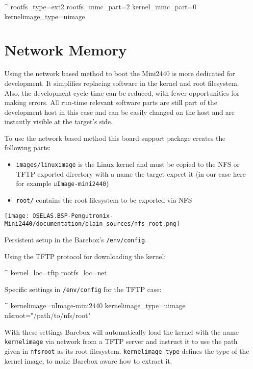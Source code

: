 \begin{ptxshell}[escapechar=|]{^}
rootfs_type=ext2
rootfs_mmc_part=2
kernel_mmc_part=0
kernelimage_type=uimage
\end{ptxshell}

\section{Network Memory}				\label{sec:networkmem}

Using the network based method to boot the Mini2440 is more dedicated for
development. It simplifies replacing software in the kernel and root filesystem.
Also, the development cycle time can be reduced, with fewer opportunities for
making errors. All run-time relevant software parts are still
part of the development host in this case and can be easily changed on the
host and are instantly visible at the target's side.

To use the network based method this board support package creates the
following parts:

\begin{itemize}
\item \texttt{\ptxdistPlatformDir images/linuximage} is the Linux kernel
	and must be copied to the NFS or TFTP exported directory with a
	name the target expect it (in our case here for example
	\texttt{uImage-mini2440})
\item \texttt{\ptxdistPlatformDir root/} contains the root filesystem
	to be exported via NFS
\end{itemize}

\centerline{\texttt{[image: OSELAS.BSP-Pengutronix-Mini2440/documentation/plain\_sources/nfs\_root.png]}}

Persistent setup in the Barebox's \texttt{/env/config}.

Using the TFTP protocol for downloading the kernel:

\begin{ptxshell}[escapechar=|]{^}
kernel_loc=tftp
rootfs_loc=net
\end{ptxshell}

Specific settings in \texttt{/env/config} for the TFTP case:

\begin{ptxshell}[escapechar=|]{^}
kernelimage=uImage-mini2440
kernelimage_type=uimage
nfsroot="/path/to/nfs/root"
\end{ptxshell}

With these settings Barebox will automatically load the kernel with the name
\texttt{kernelimage} via network from a TFTP server and instruct it to use
the path given in \texttt{nfsroot} as its root filesystem.
\texttt{kernelimage\_type} defines the type of the kernel image, to make
Barebox aware how to extract it.

